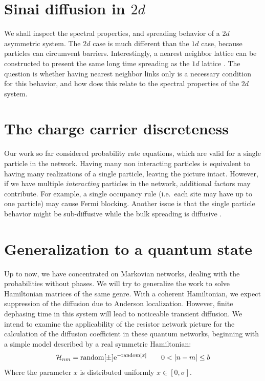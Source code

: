 \section{Sinai diffusion in $2d$}

We shall inspect the spectral properties, and spreading behavior of a $2d$ asymmetric system. The
$2d$ case is much different than the $1d$ case, because particles can circumvent barriers. Interestingly,
a nearest neighbor lattice can be constructed to present the same long time spreading as the $1d$ lattice \cite{blumberg_selinger_diffusion_1989}.
The question is whether having nearest neighbor links only is a necessary condition for this behavior,
and how does this relate to the spectral properties of the $2d$ system.


\section{The charge carrier discreteness}\label{sec:discreteness}

Our work so far considered probability rate equations, which are valid for a single particle in the network.
Having many non interacting particles is equivalent to having many realizations of a single particle,
leaving the picture intact. However, if we have multiple \emph{interacting} particles in the network, additional factors may contribute. For example,
a single occupancy rule (i.e.\ each site may have up to one particle) may cause Fermi blocking. Another
issue is that the single particle behavior might be sub-diffusive while the bulk spreading is diffusive \cite{richards_theory_1977,hung_diffusion_2012}.


\section{Generalization to a quantum state}

Up to now, we have concentrated on Markovian networks, dealing with the probabilities without phases.
We will try to generalize the work to solve Hamiltonian matrices of the same genre.
With a coherent Hamiltonian, 
we expect suppression of the diffusion due to Anderson localization. However, finite
dephasing time in this system will lead to noticeable transient diffusion.
We intend to examine the applicability of the resistor network picture for 
the calculation of the diffusion coefficient in these quantum networks, beginning with
a simple model described by a real symmetric Hamiltonian:
%
\begin{align}
  \mathcal{H}_{nm} = \textrm{random}[\pm] \eexp{-\textrm{random}[x]} \qquad 0<|n-m|\le b
\end{align}
%
Where the parameter $x$ is distributed uniformly $x\in [0,\sigma]$. 

